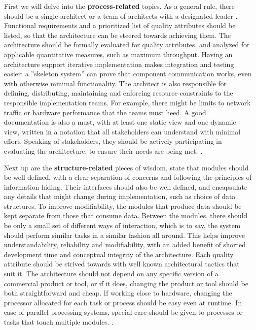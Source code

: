 \documentclass[utf8,english]{gradu3}
\begin{document}
First we will delve into the \textbf{process-related} topics. As a general rule, there
should be a single architect or a team of architects with a designated leader
\parencite[15]{Bass1998}. Functional requirements and a prioritized list of quality
attributes should be listed, so that the architecture can be steered towards
achieving them. The architecture should be formally evaluated for quality
attributes, and analyzed for applicable quantitative measures, such as maximum
throughput. Having an architecture support iterative implementation makes
integration and testing easier: a ''skeleton system'' can prove that component
communication works, even with otherwise minimal functionality. The architect is
also responsible for defining, distributing, maintaining and enforcing resource
constraints to the responsible implementation teams. For example, there might be
limits to network traffic or hardware performance that the teams must heed. A
good documentation is also a must, with at least one static view and one dynamic
view, written in a notation that all stakeholders can understand with minimal
effort. Speaking of stakeholders, they should be actively participating in
evaluating the architecture, to ensure their needs are being met. \parencite[15]{Bass1998}.

Next up are the \textbf{structure-related} pieces of wisdom. \textcite[16]{Bass1998} state that
modules should be well defined, with a clear separation of concerns and
following the principles of information hiding. Their interfaces should also be
well defined, and encapsulate any details that might change during
implementation, such as choice of data structures. To improve modifiability, the
modules that produce data should be kept separate from those that consume data.
Between the modules, there should be only a small set of different ways of
interaction, which is to say, the system should perform similar tasks in a
similar fashion all around. This helps improve understandability, reliability
and modifiability, with an added benefit of shorted development time and
conceptual integrity of the architecture. Each quality attribute should be
strived towards with well known architectural tactics that suit it. The
architecture should not depend on any specific version of a commercial product
or tool, or if it does, changing the product or tool should be both
straightforward and cheap. If working close to hardware, changing the processor
allocated for each task or process should be easy even at runtime. In case of
parallel-processing systems, special care should be given to processes or tasks
that touch multiple modules. \parencite[16]{Bass1998}.
\end{document}
